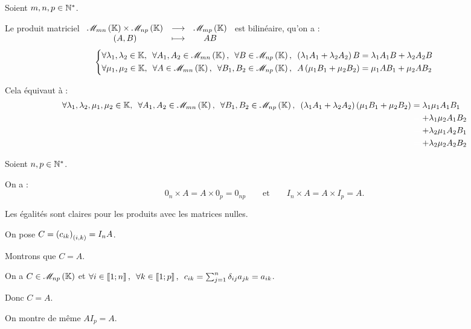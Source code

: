 \begin{prop}
Soient \(m,n,p\in\mathbb{N}^*\).

Le produit matriciel \(\fonctionlambda{\M{mn}\times\M{np}}{\M{mp}}{\paren{A,B}}{AB}\) est bilinéaire, \cad qu'on a : \[\begin{dcases}
\quantifs{\forall\lambda_1,\lambda_2\in\K;\forall A_1,A_2\in\M{mn};\forall B\in\M{np}}\paren{\lambda_1A_1+\lambda_2A_2}B=\lambda_1A_1B+\lambda_2A_2B \\
\quantifs{\forall\mu_1,\mu_2\in\K;\forall A\in\M{mn};\forall B_1,B_2\in\M{np}}A\paren{\mu_1B_1+\mu_2B_2}=\mu_1AB_1+\mu_2AB_2
\end{dcases}\]

Cela équivaut à : \[\begin{aligned}
\quantifs{\forall\lambda_1,\lambda_2,\mu_1,\mu_2\in\K;\forall A_1,A_2\in\M{mn};\forall B_1,B_2\in\M{np}}\paren{\lambda_1A_1+\lambda_2A_2}\paren{\mu_1B_1+\mu_2B_2}&=\lambda_1\mu_1A_1B_1 \\
&\color{white}=\color{black}+\lambda_1\mu_2A_1B_2 \\
&\color{white}=\color{black}+\lambda_2\mu_1A_2B_1 \\
&\color{white}=\color{black}+\lambda_2\mu_2A_2B_2
\end{aligned}\]
\end{prop}

\begin{prop}
Soient \(n,p\in\mathbb{N}^*\).

On a : \[0_n\times A=A\times0_p=0_{np}\qquad\text{et}\qquad I_n\times A=A\times I_p=A.\]
\end{prop}

\begin{dem}
Les égalités sont claires pour les produits avec les matrices nulles.

On pose \(C=\left(c_{ik}\right)_{\left(i,k\right)}=I_nA\).

Montrons que \(C=A\).

On a \(C\in\M{np}\) et \(\quantifs{\forall i\in\interventierii{1}{n};\forall k\in\interventierii{1}{p}}c_{ik}=\sum_{j=1}^n\delta_{ij}a_{jk}=a_{ik}\).

Donc \(C=A\).

On montre de même \(AI_p=A\).
\end{dem}

